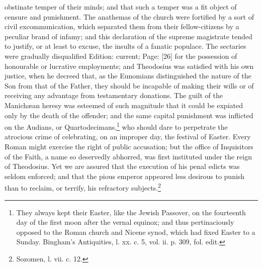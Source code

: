 obstinate temper of their minds; and that such a temper was a fit object of censure and punishment. The anathemas of the church were fortified by a sort of civil excommunication, which separated them from their fellow-citizens by a peculiar brand of infamy; and this declaration of the supreme magistrate tended to justify, or at least to excuse, the insults of a fanatic populace. The sectaries were gradually disqualified Edition: current; Page: [26] for the possession of honourable or lucrative employments; and Theodosius was satisfied with his own justice, when he decreed that, as the Eunomians distinguished the nature of the Son from that of the Father, they should be incapable of making their wills or of receiving any advantage from testamentary donations. The guilt of the Manichæan heresy was esteemed of such magnitude that it could be expiated only by the death of the offender; and the same capital punishment was inflicted on the Audians, or Quartodecimans,\footnote{They always kept their Easter, like the Jewish Passover, on the fourteenth day of the first moon after the vernal equinox; and thus pertinaciously opposed to the Roman church and Nicene synod, which had fixed Easter to a Sunday. Bingham\texthebrew{}’s Antiquities, l. xx. c. 5, vol. ii. p. 309, fol. edit.} who should dare to perpetrate the atrocious crime of celebrating, on an improper day, the festival of Easter. Every Roman might exercise the right of public accusation; but the office of Inquisitors of the Faith, a name so deservedly abhorred, was first instituted under the reign of Theodosius. Yet we are assured that the execution of his penal edicts was seldom enforced; and that the pious emperor appeared less desirous to punish than to reclaim, or terrify, his refractory subjects.\footnote{Sozomen, l. vii. c. 12.}

